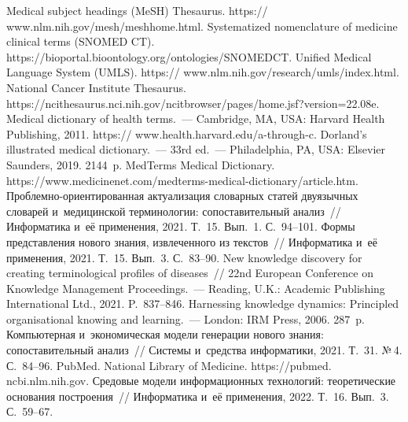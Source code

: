 \begin{multicols}{2}
{\small\frenchspacing
 {%
 \begin{thebibliography}{99}
Medical subject headings (MeSH) Thesaurus. {\sf https:// www.nlm.nih.gov/mesh/meshhome.html.}
Systematized nomenclature of medicine clinical terms (SNOMED CT). {\sf 
https://bioportal.bioontology.org/\linebreak ontologies/SNOMEDCT}.
Unified Medical Language System (UMLS). {\sf https:// www.nlm.nih.gov/research/umls/index.html.}
National Cancer Institute Thesaurus. {\sf 
https://\linebreak ncithesaurus.nci.nih.gov/ncitbrowser/pages/home.jsf?\linebreak version=22.08e.}
Medical dictionary of health terms.~--- Cambridge, MA, USA: Harvard Health Publishing, 2011. 
{\sf https:// www.health.harvard.edu/a-through-c}.
Dorland's illustrated medical dictionary.~--- 33rd ed.~--- Philadelphia, PA, USA: Elsevier 
Saunders, 2019. 2144~p.
MedTerms Medical Dictionary. {\sf  
https://www.\linebreak medicinenet.com/medterms-medical-dictionary/article.\linebreak htm}.
 Проб\-лем\-но-ори\-ен\-ти\-ро\-ван\-ная актуализация словарных 
статей двуязычных словарей и~медицинской терминологии: сопоставительный анализ~// 
Информатика и~её применения, 2021. Т.~15. Вып.~1. С.~94--101.
 Формы представления нового знания, извлеченного из текс\-тов~// 
Информатика и~её применения, 2021. Т.~15. Вып.~3. С.~83--90.
 New knowledge discovery for creating terminological profiles 
of diseases~// 22nd European Conference on Knowledge Management Proceedings.~--- 
Reading, U.K.: Academic Publishing International Ltd., 2021. P.~837--846.
 Harnessing knowledge dynamics: Principled organisational knowing and 
learning.~--- London: IRM Press, 2006. 287~p.
 Компьютерная и~экономическая модели генерации нового знания: 
сопоставительный анализ~// Сис\-те\-мы и~средства информатики, 2021. Т.~31. №\,4.  
С.~84--96.
PubMed. National Library of Medicine. {\sf https://pubmed. ncbi.nlm.nih.gov}.
 Средовые модели информационных технологий: теоретические 
основания построения~// Информатика и~её применения, 2022. Т.~16. Вып.~3. С.~59--67.

\end{thebibliography}}}
\end{multicols}
